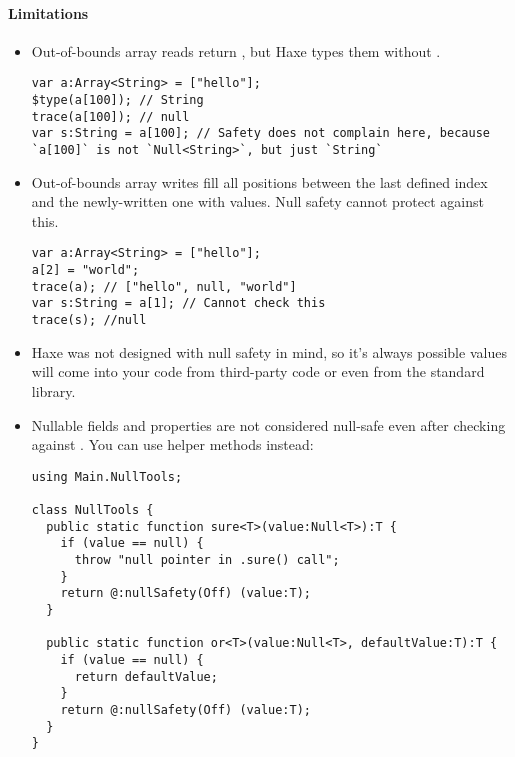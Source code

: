 \paragraph{Limitations}

\begin{itemize}
	\item Out-of-bounds array reads return , but Haxe types them without .
	\begin{lstlisting}
var a:Array<String> = ["hello"];
$type(a[100]); // String
trace(a[100]); // null
var s:String = a[100]; // Safety does not complain here, because `a[100]` is not `Null<String>`, but just `String`
\end{lstlisting}
	\item Out-of-bounds array writes fill all positions between the last defined index and the newly-written one with  values. Null safety cannot protect against this.
	\begin{lstlisting}
var a:Array<String> = ["hello"];
a[2] = "world";
trace(a); // ["hello", null, "world"]
var s:String = a[1]; // Cannot check this
trace(s); //null
\end{lstlisting}
	\item Haxe was not designed with null safety in mind, so it's always possible  values will come into your code from third-party code or even from the standard library.
	\item Nullable fields and properties are not considered null-safe even after checking against . You can use helper methods instead:
	\begin{lstlisting}
using Main.NullTools;

class NullTools {
  public static function sure<T>(value:Null<T>):T {
    if (value == null) {
      throw "null pointer in .sure() call";
    }
    return @:nullSafety(Off) (value:T);
  }

  public static function or<T>(value:Null<T>, defaultValue:T):T {
    if (value == null) {
      return defaultValue;
    }
    return @:nullSafety(Off) (value:T);
  }
}


\end{lstlisting}
\end{itemize}
